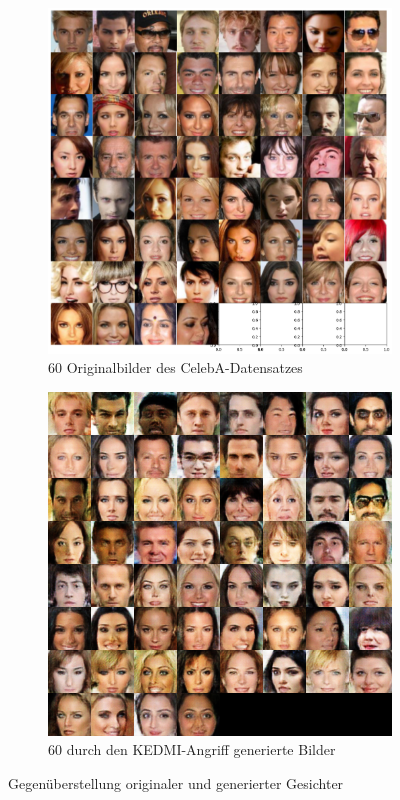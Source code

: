 \begin{figure}[H]
	\centering
	\begin{subfigure}[b]{0.35\linewidth}
		\includegraphics[width=\linewidth]{Bilder/celeba_orig.png}
		\caption{60 Originalbilder des CelebA-Datensatzes}
		\label{img:kedmi_celeba_orig}
	\end{subfigure}
	\hspace{1cm} %
	\begin{subfigure}[b]{0.348\linewidth}
		\includegraphics[width=\linewidth]{Bilder/kedmi_celeba.png}
		\caption{60 durch den \glqq KEDMI\grqq-Angriff generierte Bilder}
		\label{img:kedmi_celeba_gen}
	\end{subfigure}
	\caption{Gegenüberstellung originaler und generierter Gesichter}
	\label{img:kedmi_celeba_visuell}
\end{figure}

